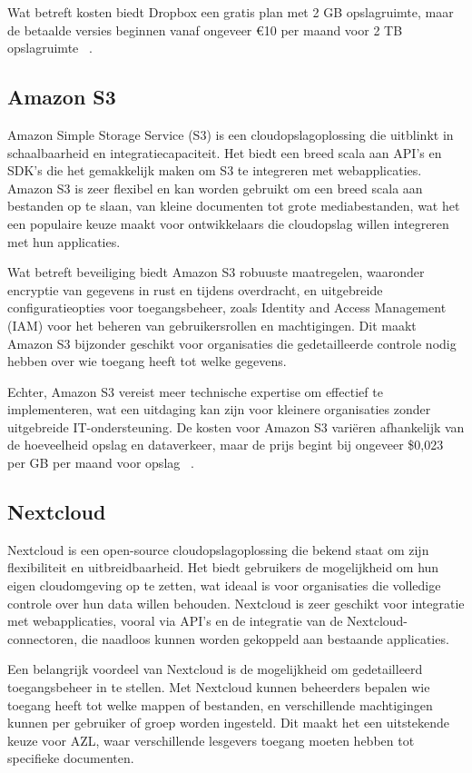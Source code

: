 Wat betreft kosten biedt Dropbox een gratis plan met 2 GB opslagruimte, maar de betaalde versies beginnen vanaf ongeveer €10 per maand voor 2 TB opslagruimte ~\autocite{Dropbox2024}.

\subsection{Amazon S3}
Amazon Simple Storage Service (S3) is een cloudopslagoplossing die uitblinkt in schaalbaarheid en integratiecapaciteit. Het biedt een breed scala aan API's en SDK's die het gemakkelijk maken om S3 te integreren met webapplicaties. Amazon S3 is zeer flexibel en kan worden gebruikt om een breed scala aan bestanden op te slaan, van kleine documenten tot grote mediabestanden, wat het een populaire keuze maakt voor ontwikkelaars die cloudopslag willen integreren met hun applicaties.

Wat betreft beveiliging biedt Amazon S3 robuuste maatregelen, waaronder encryptie van gegevens in rust en tijdens overdracht, en uitgebreide configuratieopties voor toegangsbeheer, zoals Identity and Access Management (IAM) voor het beheren van gebruikersrollen en machtigingen. Dit maakt Amazon S3 bijzonder geschikt voor organisaties die gedetailleerde controle nodig hebben over wie toegang heeft tot welke gegevens.

Echter, Amazon S3 vereist meer technische expertise om effectief te implementeren, wat een uitdaging kan zijn voor kleinere organisaties zonder uitgebreide IT-ondersteuning. De kosten voor Amazon S3 variëren afhankelijk van de hoeveelheid opslag en dataverkeer, maar de prijs begint bij ongeveer \$0,023 per GB per maand voor opslag ~\autocite{AWS2024}.

\subsection{Nextcloud}
Nextcloud is een open-source cloudopslagoplossing die bekend staat om zijn flexibiliteit en uitbreidbaarheid. Het biedt gebruikers de mogelijkheid om hun eigen cloudomgeving op te zetten, wat ideaal is voor organisaties die volledige controle over hun data willen behouden. Nextcloud is zeer geschikt voor integratie met webapplicaties, vooral via API's en de integratie van de Nextcloud-connectoren, die naadloos kunnen worden gekoppeld aan bestaande applicaties.

Een belangrijk voordeel van Nextcloud is de mogelijkheid om gedetailleerd toegangsbeheer in te stellen. Met Nextcloud kunnen beheerders bepalen wie toegang heeft tot welke mappen of bestanden, en verschillende machtigingen kunnen per gebruiker of groep worden ingesteld. Dit maakt het een uitstekende keuze voor AZL, waar verschillende lesgevers toegang moeten hebben tot specifieke documenten.

